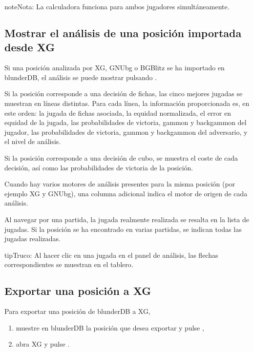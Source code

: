 \documentclass[letterpaper,10pt,spanish]{sphinxmanual}
\begin{document}
\begin{sphinxadmonition}{note}{Nota:}
\sphinxAtStartPar
La calculadora funciona para ambos jugadores simultáneamente.
\end{sphinxadmonition}


\subsection{Mostrar el análisis de una posición importada desde XG}
\label{\detokenize{guide_utilisateur:afficher-l-analyse-d-une-position-importee-depuis-xg}}
\sphinxAtStartPar
Si una posición analizada por XG, GNUbg o BGBlitz se ha importado en blunderDB, el análisis se puede mostrar pulsando .

\sphinxAtStartPar
Si la posición corresponde a una decisión de fichas, las cinco mejores jugadas se muestran en líneas distintas. Para cada línea, la información proporcionada es, en este orden: la jugada de fichas asociada, la equidad normalizada, el error en equidad de la jugada, las probabilidades de victoria, gammon y backgammon del jugador, las probabilidades de victoria, gammon y backgammon del adversario, y el nivel de análisis.

\sphinxAtStartPar
Si la posición corresponde a una decisión de cubo, se muestra el coste de cada decisión, así como las probabilidades de victoria de la posición.

\sphinxAtStartPar
Cuando hay varios motores de análisis presentes para la misma posición (por ejemplo XG y GNUbg), una columna adicional indica el motor de origen de cada análisis.

\sphinxAtStartPar
Al navegar por una partida, la jugada realmente realizada se resalta en la lista de jugadas. Si la posición se ha encontrado en varias partidas, se indican todas las jugadas realizadas.

\begin{sphinxadmonition}{tip}{Truco:}
\sphinxAtStartPar
Al hacer clic en una jugada en el panel de análisis, las flechas correspondientes se muestran en el tablero.
\end{sphinxadmonition}


\subsection{Exportar una posición a XG}
\label{\detokenize{guide_utilisateur:exporter-une-position-vers-xg}}
\sphinxAtStartPar
Para exportar una posición de blunderDB a XG,
\begin{enumerate}
%
\item {} 
\sphinxAtStartPar
muestre en blunderDB la posición que desea exportar y pulse ,

\item {} 
\sphinxAtStartPar
abra XG y pulse .

\end{enumerate}
\end{document}
